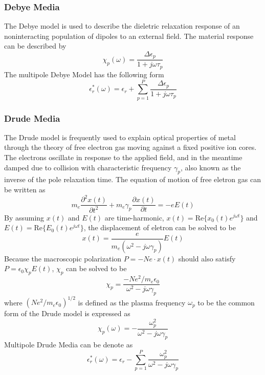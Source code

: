 \subsubsection{Debye Media}
The Debye model is used to describe the dieletric relaxation response of an noninteracting population of dipoles to an
external field. The material response can be described by 
\begin{equation}
  \label{eq:debye_chi}
  \chi_p(\omega) = \frac{\Delta\epsilon_p}{1+j\omega\tau_p}  
\end{equation}
The multipole Debye Model has the following form
\begin{equation}
  \epsilon_r^*(\omega) = \epsilon_r + \sum_{p=1}^P \frac{\Delta\epsilon_p}{1+j\omega\tau_p}  
\end{equation}


\subsubsection{Drude Media}
The Drude model is frequently used to explain optical properties of metal through the theory of free electron gas moving
against a fixed positive ion cores. The electrons oscillate in response to the applied field, and in the meantime damped
due to collision with characteristic frequency $\gamma_p$, also known as the inverse of the pole relaxation time. The
equation of motion of free eletron gas can be written as
\begin{equation}
  m_e\frac{\partial^2 x(t)}{\partial t^2} + m_e\gamma_p\frac{\partial x(t)}{\partial t} = -eE(t)
\end{equation}
By assuming $x(t)$ and $E(t)$ are time-harmonic, $x(t) = \mathrm{Re}\{x_0(t)e^{j\omega t}\}$ and $E(t) =
\mathrm{Re}\{E_0(t)e^{j\omega t}\}$, the displacement of eletron can be solved to be
\begin{equation}
  x(t) = \frac{e}{m_e(\omega^2 - j\omega\gamma_p)}E(t)
\end{equation}
Because the macroscopic polarization $P = -Ne\cdot x(t)$ should also satisfy $P = \epsilon_0\chi_pE(t)$, $\chi_p$ can be
solved to be
\begin{equation}
  \chi_p = \frac{-Ne^2/m_e\epsilon_0}{\omega^2 - j\omega\gamma_p}
\end{equation}
where $(Ne^2/m_e\epsilon_0)^{1/2}$ is defined as the plasma frequency $\omega_p$ to be the common form of the Drude
model is expressed as
\begin{equation}
  \label{eq:drude_chi}
  \chi_p(\omega) = -\frac{\omega_p^2}{\omega^2 - j\omega\gamma_p}  
\end{equation}
Multipole Drude Media can be denote as 
\begin{equation}
  \epsilon_r^*(\omega) = \epsilon_r - \sum_{p=1}^P \frac{\omega_p^2}{\omega^2-j\omega\gamma_p}
\end{equation}



